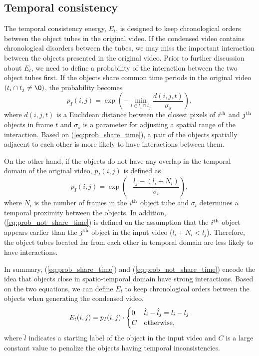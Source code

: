 \documentclass[11pt]{hyu_thesis}
\begin{document}
\subsection{Temporal consistency}
The temporal consistency energy, $E_t$, is designed to keep chronological orders between the object tubes in the original video. If the condensed video contains chronological disorders between the tubes, we may miss the important interaction between the objects presented in the original video. Prior to further discussion about $E_t$, we need to define a probability of the interaction between the two object tubes first. If the objects share common time periods in the original video $(t_i \cap t_j \neq \O)$, the probability becomes
\begin{equation}
\label{eq:prob_share_time}
p_I(i, j) = 
\exp\left(-\min_{t \in t_i \cap t_j} \frac{d(i,j,t)}{\sigma_s}\right),
\end{equation}
where $d(i,j,t)$ is a Euclidean distance between the closest pixels of $i^{\rm{th}}$ and $j^{\rm{th}}$ objects in frame $t$ and $\sigma_s$ is a parameter for adjusting a spatial range of the interaction. Based on (\ref{eq:prob_share_time}), a pair of the objects spatially adjacent to each other is more likely to have interactions between them.

On the other hand, if the objects do not have any overlap in the temporal domain of the original video, $p_I(i,j)$ is defined as
\begin{equation}
\label{eq:prob_not_share_time}
p_I(i,j)=\exp\left(-\frac{l_j - (l_i + N_i)}{\sigma_t}\right),
\end{equation}
where $N_i$ is the number of frames in the $i^{\rm{th}}$ object tube and $\sigma_t$ determines a temporal proximity between the objects. In addition, (\ref{eq:prob_not_share_time}) is defined on the assumption that the $i^{\rm{th}}$ object appears earlier than the $j^{\rm{th}}$ object in the input video ($l_i + N_i < l_j$). Therefore, the object tubes located far from each other in temporal domain are less likely to have interactions.

In summary, (\ref{eq:prob_share_time}) and (\ref{eq:prob_not_share_time}) encode the idea that objects close in spatio-temporal domain have strong interactions. Based on the two equations, we can define $E_t$ to keep chronological orders between the objects when generating the condensed video.
\begin{equation}
\label{eq:Et}
E_t(i,j)=
p_I(i, j) \cdot
\begin{cases}
0 & \hat{l}_i - \hat{l}_j = l_i - l_j \\
C & \rm{otherwise},
\end{cases}
\end{equation}
where $\hat{l}$ indicates a starting label of the object in the input video and $C$ is a large constant value to penalize the objects having temporal inconsistencies. 
\end{document}
